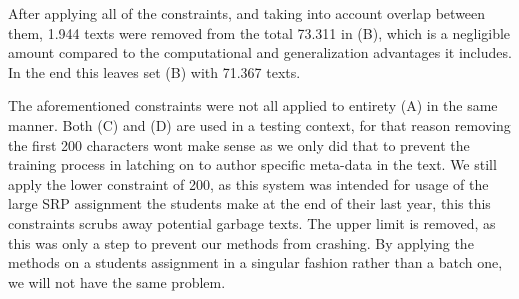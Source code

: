 After applying all of the constraints, and taking into account overlap between
them, 1.944 texts were removed from the total 73.311 in (B), which is a
negligible amount compared to the computational and generalization advantages it
includes. In the end this leaves set (B) with 71.367 texts.

The aforementioned constraints were not all applied to entirety (A) in the same
manner. Both (C) and (D) are used in a testing context, for that reason removing
the first 200 characters wont make sense as we only did that to prevent the
training process in latching on to author specific meta-data in the text. We
still apply the lower constraint of 200, as this system was intended for usage
of the large SRP assignment the students make at the end of their last year,
this this constraints scrubs away potential garbage texts. The upper limit
is removed, as this was only a step to prevent our methods from crashing. By
applying the methods on a students assignment in a singular fashion rather than
a batch one, we will not have the same problem.

